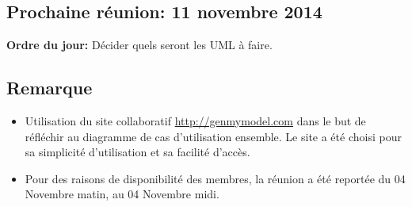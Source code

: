 \documentclass{article}
\begin{document}
\subsection*{Prochaine réunion: 11 novembre 2014}
	\textbf{Ordre du jour:} Décider quels seront les UML à faire.
	
\subsection*{Remarque}
\begin{itemize}
	\item Utilisation du site collaboratif \url{http://genmymodel.com} dans le but de réfléchir au diagramme de cas d'utilisation ensemble. Le site a été choisi pour sa simplicité d'utilisation et sa facilité d'accès.
	\item Pour des raisons de disponibilité des membres, la réunion a été reportée du 04 Novembre matin, au 04 Novembre midi.
\end{itemize}
\end{document}
